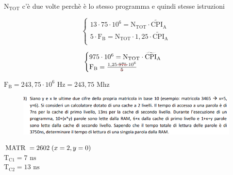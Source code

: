 \textsf{{\small $\text{N}_\text{TOT} $ c'è due volte perchè è lo stesso programma e quindi stesse istruzioni}}  \\

\noindent\begin{minipage}{.5\linewidth}
\begin{equation*}
\begin{cases}
13 \cdot 75 \cdot 10^6 = \text{N}_\text{TOT} \cdot \widetilde{\text{CPI}}_\text{A} \\
5 \cdot \text{F}_\text{B} = \text{N}_\text{TOT} \cdot 1,25 \cdot \widetilde{\text{CPI}}_\text{A} \\
\end{cases}
\end{equation*}
\end{minipage}
\begin{minipage}{.35\linewidth}
	\begin{equation*}
		\begin{cases}
			975 \cdot 10^6 = \text{N}_\text{TOT} \cdot \widetilde{\text{CPI}}_\text{A} \\
		    \text{F}_\text{B} = \frac{1,25 \cdot \text{\color{red}\sout{\normalcolor975}} \cdot 10^6}{\text{\color{red}\sout{\normalcolor5}}} \\
		\end{cases}
	\end{equation*}
\end{minipage}

$ \text{F}_\text{B} = 243,75 \cdot 10^6 \text{ Hz} = 243,75 \text{ Mhz} $ \\


\begin{figure}[ht]
	\includegraphics[width=1\linewidth]{es3_MiglioramentoPrestazioneMemoria}
	\label{fig:es3MiglioramentoPrestazioneMemoria}
\end{figure}

$ \text{MATR } = 2602 \hspace{0.1cm}(x = 2, y = 0) $ \\

$\text{T}_\text{C1} = 7 \text{ ns} $\\
$\text{T}_\text{C2} = 13 \text{ ns} $\\

